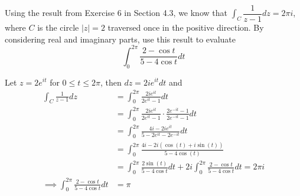 \documentclass[12pt]{article}
\newenvironment{problem}[2][Problem]{\begin{trivlist}
\item[\hskip \labelsep {\bfseries #1} \hskip \labelsep {\bfseries #2.}]}{\end{trivlist}}
\begin{document}
\begin{problem}{2}
	Using the result from Exercise 6 in Section 4.3, we know that $\int_{C} \dfrac{1}{z - 1}dz = 2\pi i$, where $C$ is the circle $|z| = 2$ traversed once in the positive direction. By considering real and imaginary parts, use this result to evaluate
	\[
		\int_0^{2\pi} \frac{2 - \cos t}{5 - 4\cos t}dt
	\]
\end{problem}
Let $z = 2e^{it}$ for $0 \le t \le 2\pi$, then $dz = 2ie^{it}dt$ and
\begin{align*}
	\int_{C} \frac{1}{z - 1}dz &= \int_{0}^{2\pi} \frac{2ie^{it}}{2e^{it} - 1}dt \\
				   &= \int_0^{2\pi} \frac{2ie^{it}}{2e^{it} - 1} \cdot \frac{2e^{-it} - 1}{2e^{-it} - 1}dt \\
				   &= \int_0^{2\pi} \frac{4i - 2ie^{it}}{5 - 2e^{it} - 2e^{-it}}dt \\
				   &= \int_0^{2\pi} \frac{4i - 2i(\cos(t) + i\sin(t))}{5 - 4\cos(t)} \\
				   &= \int_0^{2\pi} \frac{2\sin(t)}{5 - 4\cos t}dt + 2i\int_{0}^{2\pi} \frac{2 - \cos t}{5 - 4\cos t}dt = 2\pi i \\
	\implies \int_0^{2\pi} \frac{2 - \cos t}{5 - 4\cos t}dt &= \pi
\end{align*}
\end{document}

